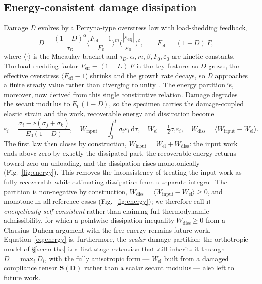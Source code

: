 \documentclass[11pt]{article}
\newcommand{\epsd}{\dot{\varepsilon}}
\begin{document}
\subsection{Energy-consistent damage dissipation}\label{sec:energy}

Damage $D$ evolves by a Perzyna-type overstress law with load-shedding feedback,
\begin{equation}
\dot D=\frac{(1-D)^{\alpha}}{\tau_D}
\Big\langle\frac{F_{\mathrm{eff}}-1}{F_0}\Big\rangle^{m}
\Big(\frac{|\epsd_{\mathrm{eq}}|}{\epsd_0}\Big)^{\beta},
\qquad F_{\mathrm{eff}}=(1-D)\,F,
\label{eq:damage}
\end{equation}
where $\langle\cdot\rangle$ is the Macaulay bracket and
$\tau_D,\alpha,m,\beta,F_0,\epsd_0$ are kinetic constants. The load-shedding
factor $F_{\mathrm{eff}}=(1-D)\,F$ is the key feature: as $D$ grows, the effective
overstress $\langle F_{\mathrm{eff}}-1\rangle$ shrinks and the growth rate decays,
so $D$ approaches a finite steady value rather than diverging to
unity~\citep{perzyna1966,lemaitre1985}. The energy partition is, moreover, now
derived from this single constitutive relation. Damage degrades the secant modulus to $E_0(1-D)$, so the specimen
carries the damage-coupled elastic strain and the work, recoverable energy and
dissipation become
\begin{equation}
\varepsilon_i=\frac{\sigma_i-\nu(\sigma_j+\sigma_k)}{E_0(1-D)},\quad
W_{\mathrm{input}}=\!\int_0^t\!\sigma_i\dot\varepsilon_i\,\mathrm{d}\tau,\quad
W_{\mathrm{el}}=\tfrac12\sigma_i\varepsilon_i,\quad
W_{\mathrm{diss}}=\big\langle W_{\mathrm{input}}-W_{\mathrm{el}}\big\rangle .
\label{eq:energy}
\end{equation}
The first law then closes by construction,
$W_{\mathrm{input}}=W_{\mathrm{el}}+W_{\mathrm{diss}}$: the input work ends above
zero by exactly the dissipated part, the recoverable energy returns toward zero on
unloading, and the dissipation rises monotonically (Fig.~\ref{fig:energy}). This
removes the inconsistency of treating the input work as fully recoverable while
estimating dissipation from a separate integral. The partition is non-negative by
construction, $W_{\mathrm{diss}}=\langle W_{\mathrm{input}}-W_{\mathrm{el}}\rangle\ge0$,
and monotone in all reference cases (Fig.~\ref{fig:energy}); we therefore call it
\emph{energetically self-consistent} rather than claiming full thermodynamic
admissibility, for which a pointwise dissipation inequality
$\dot W_{\mathrm{diss}}\ge0$ from a Clausius--Duhem argument with the free energy
remains future work. Equation~\eqref{eq:energy} is, furthermore, the
\emph{scalar}-damage partition; the orthotropic model of \S\ref{sec:ortho} is a
first-stage extension that still inherits it through $D=\max_i D_i$, with the
fully anisotropic form --- $W_{\mathrm{el}}$ built from a damaged compliance
tensor $\mathbf{S}(\mathbf{D})$ rather than a scalar secant modulus --- also left
to future work.
\end{document}
